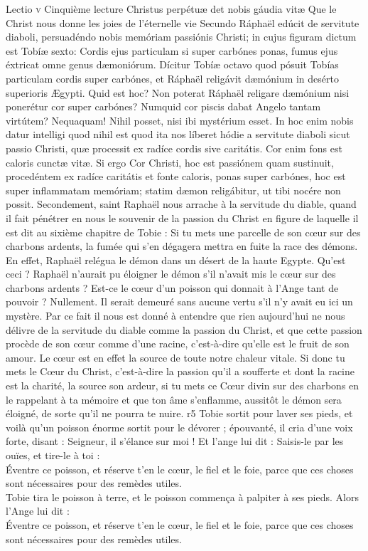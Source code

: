 \documentclass[twoside]{article}
\begin{document}
\begin{paracol}[1]{2}
\lectioresponsorium
	{Lectio \textsc{v}}
	{Cinquième lecture}
	{Christus perpétuæ det nobis gáudia vitæ}
	{Que le Christ nous donne les joies de l'éternelle vie}
	{
		Secundo Ráphaël edúcit de servitute diaboli, persuadéndo nobis memóriam passiónis Christi; in cujus figuram dictum est Tobíæ sexto: Cordis ejus particulam si super carbónes ponas, fumus ejus éxtricat omne genus dæmoniórum. Dícitur Tobíæ octavo quod pósuit Tobías particulam cordis super carbónes, et Ráphaël religávit dæmónium in desérto superioris Ægypti. Quid est hoc? Non poterat Ráphaël religare dæmónium nisi ponerétur cor super carbónes? Numquid cor piscis dabat Angelo tantam virtútem? Nequaquam! Nihil posset, nisi ibi mystérium esset. In hoc enim nobis datur intelligi quod nihil est quod ita nos líberet hódie a servitute diaboli sicut passio Christi, quæ processit ex radíce cordis sive caritátis. Cor enim fons est caloris cunctæ vitæ. Si ergo Cor Christi, hoc est passiónem quam sustinuit, procedéntem ex radíce caritátis et fonte caloris, ponas super carbónes, hoc est super inflammatam memóriam; statim dæmon religábitur, ut tibi nocére non possit.
	}
	{
		Secondement, saint Raphaël nous arrache à la servitude du diable, quand il fait pénétrer en nous le souvenir de la passion du Christ en figure de laquelle il est dit au sixième chapitre de Tobie : Si tu mets une parcelle de son cœur sur des charbons ardents, la fumée qui s’en dégagera mettra en fuite la race des démons. En effet, Raphaël relégua le démon dans un désert de la haute Egypte. Qu’est ceci ? Raphaël n’aurait pu éloigner le démon s’il n’avait mis le cœur sur des charbons ardents ? Est-ce le cœur d’un poisson qui donnait à l’Ange tant de pouvoir ? Nullement. Il serait demeuré sans aucune vertu s’il n’y avait eu ici un mystère. Par ce fait il nous est donné à entendre que rien aujourd’hui ne nous délivre de la servitude du diable comme la passion du Christ, et que cette passion procède de son cœur comme d’une racine, c’est-à-dire qu’elle est le fruit de son amour. Le cœur est en effet la source de toute notre chaleur vitale. Si donc tu mets le Cœur du Christ, c’est-à-dire la passion qu’il a soufferte et dont la racine est la charité, la source son ardeur, si tu mets ce Cœur divin sur des charbons en le rappelant à ta mémoire et que ton âme s’enflamme, aussitôt le démon sera éloigné, de sorte qu’il ne pourra te nuire.
	}
	{r5}
	{\rr Tobie sortit pour laver ses pieds, et voilà qu’un poisson énorme sortit pour le dévorer ; épouvanté, il cria d’une voix forte, disant : Seigneur, il s’élance sur moi ! Et l’ange lui dit : Saisis-le par les ouïes, et tire-le à toi :\\
	\GreSpecial{*} Éventre ce poisson, et réserve t’en le cœur, le fiel et le foie, parce que ces choses sont nécessaires pour des remèdes utiles.\\
	\vv Tobie tira le poisson à terre, et le poisson commença à palpiter à ses pieds. Alors l’Ange lui dit :\\
	\rr Éventre ce poisson, et réserve t’en le cœur, le fiel et le foie, parce que ces choses sont nécessaires pour des remèdes utiles.}
	

\end{paracol}
\end{document}
